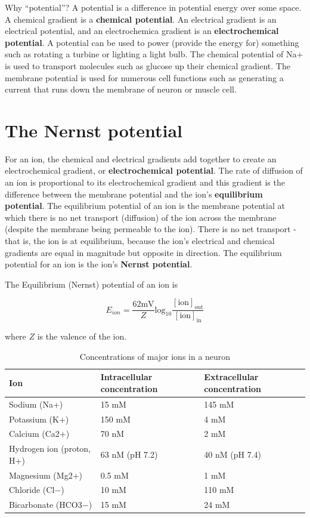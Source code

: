 \documentclass[]{book}
\begin{document}
Why ``potential''? A potential is a difference in potential energy over
some space. A chemical gradient is a \textbf{chemical potential}. An
electrical gradient is an electrical potential, and an electrochemica
gradient is an \textbf{electrochemical potential}. A potential can be
used to power (provide the energy for) something such as rotating a
turbine or lighting a light bulb. The chemical potential of Na+ is used
to transport molecules such as glucose up their chemical gradient. The
membrane potential is used for numerous cell functions such as
generating a current that runs down the membrane of neuron or muscle
cell.

\section{The Nernst potential}\label{the-nernst-potential}

For an ion, the chemical and electrical gradients add together to create
an electrochemical gradient, or \textbf{electrochemical potential}. The
rate of diffusion of an ion is proportional to its electrochemical
gradient and this gradient is the difference between the membrane
potential and the ion's \textbf{equilibrium potential}. The equilibrium
potential of an ion is the membrane potential at which there is no net
transport (diffusion) of the ion across the membrane (despite the
membrane being permeable to the ion). There is no net transport - that
is, the ion is at equilibrium, because the ion's electrical and chemical
gradients are equal in magnitude but opposite in direction. The
equilibrium potential for an ion is the ion's \textbf{Nernst potential}.

The Equilibrium (Nernst) potential of an ion is

\begin{equation}
E_{ion} = \frac{62 \mathrm{mV}}{Z} \mathrm{log}_{10} \frac{[\mathrm{ion}]_{\mathrm{out}}}{[\mathrm{ion}]_{\mathrm{in}}}
\end{equation}

where \(Z\) is the valence of the ion.

\begin{table}[t]

\caption{\label{tab:unnamed-chunk-1}Concentrations of major ions in a neuron}
\centering
\begin{tabular}{l|l|l}
\hline
Ion & Intracellular concentration & Extracellular concentration\\
\hline
Sodium (Na+) & 15 mM & 145 mM\\
\hline
Potassium (K+) & 150 mM & 4 mM\\
\hline
Calcium (Ca2+) & 70 nM & 2 mM\\
\hline
Hydrogen ion (proton, H+) & 63 nM (pH 7.2) & 40 nM (pH 7.4)\\
\hline
Magnesium (Mg2+) & 0.5 mM & 1 mM\\
\hline
Chloride (Cl−) & 10 mM & 110 mM\\
\hline
Bicarbonate (HCO3−) & 15 mM & 24 mM\\
\hline
\end{tabular}
\end{table}
\end{document}
